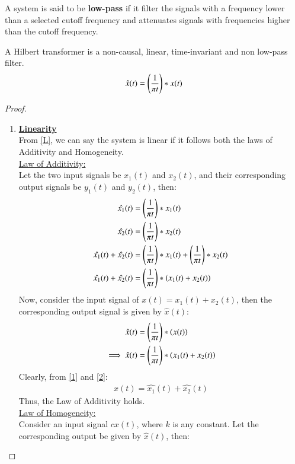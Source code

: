 \documentclass[journal,12pt,twocolumn]{IEEEtran}
\begin{document}
\begin{definition}
A system is said to be \textbf{low-pass} if it filter the signals with a frequency lower than a selected cutoff frequency and attenuates signals with frequencies higher than the cutoff frequency. \label{newdef}
\end{definition}

\begin{lemma}
A Hilbert transformer is a non-causal, linear, time-invariant and non low-pass filter.
\begin{align}
     \hat{x}(t)= \left(\frac{1}{\pi t}\right)\ast x(t)
\end{align}
\end{lemma}
\begin{proof}
\begin{enumerate}
\item \textbf{\underline{Linearity}}\\
From \eqref{L}, we can say the system is linear if it follows both the laws of Additivity and Homogeneity.\\
\underline{Law of Additivity:}\\
Let the two input signals be $x_1(t)$ and $x_2(t)$, and their corresponding output signals be $y_1(t)$ and $y_2(t)$, then:
\begin{align}
    \hat{x_1}(t)&= \left(\frac{1}{\pi t}\right)\ast x_1(t)\\
    \hat{x_2}(t)&= \left(\frac{1}{\pi t}\right)\ast x_2(t)\\
    \nonumber\hat{x_1}(t)+\hat{x_2}(t) &= \left(\frac{1}{\pi t}\right)\ast x_1(t)+\left(\frac{1}{\pi t}\right)\ast x_2(t)\\
    \hat{x_1}(t)+\hat{x_2}(t) &= \left(\frac{1}{\pi t}\right)\ast \left(x_1(t)+x_2(t)\right)
    \label{1}
\end{align}
Now, consider the input signal of $x(t)=x_1(t) + x_2(t)$, then the corresponding output signal is given by $\hat{x}(t)$:
\begin{align}
    \hat{x}(t) &= \left(\frac{1}{\pi t}\right)\ast \left(x(t)\right)\\
    \implies\hat{x}(t) &=\left(\frac{1}{\pi t}\right)\ast \left(x_1(t)+x_2(t)\right)
    \label{2}
\end{align}
Clearly, from \eqref{1} and \eqref{2}:
\begin{align}
    \hat{x}(t) = \hat{x_1}(t) + \hat{x_2}(t)
\end{align}
Thus, the Law of Additivity holds.\\
\underline{Law of Homogeneity: }\\
Consider an input signal $cx(t)$, where $k$ is any constant. Let the corresponding output be given by $\hat{x}(t)$, then:

\end{enumerate}
\end{proof}
\end{document}
